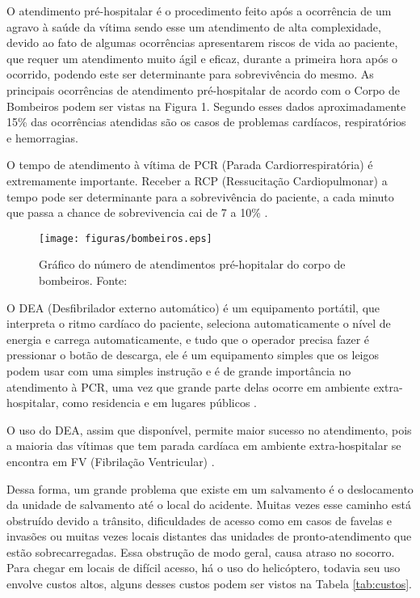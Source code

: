 O atendimento pré-hospitalar é o procedimento feito após a ocorrência de um agravo à saúde da vítima \cite{SBC} sendo esse um atendimento de alta complexidade, 
devido ao fato de algumas ocorrências apresentarem riscos de vida ao paciente, que requer um atendimento muito ágil e eficaz, durante a primeira hora após o ocorrido, 
podendo este ser determinante para sobrevivência do mesmo.\cite{PQA} 
As principais ocorrências de atendimento pré-hospitalar de acordo com o Corpo de Bombeiros podem ser vistas na Figura 1. Segundo esses dados aproximadamente 15\% das ocorrências atendidas são os casos de problemas cardíacos, respiratórios e hemorragias.


O tempo de atendimento à vítima de PCR (Parada Cardiorrespiratória) é extremamente importante. Receber a RCP (Ressucitação Cardiopulmonar) a tempo pode ser determinante para a sobrevivência do paciente, a cada minuto que passa a chance de sobrevivencia cai de 7 a 10\% \cite{SBC}. 
 \begin{figure}[H]
		\texttt{[image: figuras/bombeiros.eps]}
	\caption[Gráfico do número de atendimentos pré-hopitalar do corpo de bombeiros]{Gráfico do número de atendimentos pré-hopitalar do corpo de bombeiros. Fonte: \cite{bombeiro}}
\end{figure}

O DEA (Desfibrilador externo automático) é um equipamento portátil, que interpreta o ritmo cardíaco do paciente, seleciona automaticamente o nível de energia e carrega automaticamente, e tudo que o operador precisa fazer é pressionar o botão de descarga, ele é um equipamento simples que os leigos podem usar com uma simples instrução e é de grande importância no atendimento à PCR, uma vez que grande parte delas ocorre em ambiente extra-hospitalar, como residencia e em lugares públicos \cite{SBC}.

O uso do DEA, assim que disponível, permite maior sucesso no atendimento, pois a maioria das vítimas que tem parada cardíaca em ambiente extra-hospitalar se encontra em FV (Fibrilação Ventricular) \cite{SBC}.

Dessa forma, um grande  problema  que existe em um salvamento é o deslocamento da unidade de salvamento até o local do acidente. Muitas vezes esse caminho está obstruído devido a trânsito, dificuldades de acesso como em casos de favelas e invasões ou muitas vezes locais distantes das unidades de pronto-atendimento que estão sobrecarregadas. Essa obstrução de modo geral, causa atraso no socorro.
Para chegar em locais de difícil acesso, há o uso do helicóptero, todavia seu uso envolve custos altos, alguns desses custos podem ser vistos
na Tabela \ref{tab:custos}.

